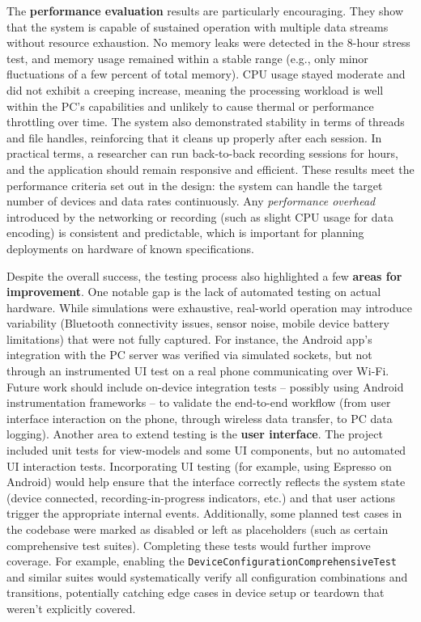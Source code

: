 The \textbf{performance evaluation} results are particularly encouraging. They show that the system is capable of sustained operation with multiple data streams without resource exhaustion. No memory leaks were detected in the 8-hour stress test, and memory usage remained within a stable range (e.g., only minor fluctuations of a few percent of total memory). CPU usage stayed moderate and did not exhibit a creeping increase, meaning the processing workload is well within the PC's capabilities and unlikely to cause thermal or performance throttling over time. The system also demonstrated stability in terms of threads and file handles, reinforcing that it cleans up properly after each session. In practical terms, a researcher can run back-to-back recording sessions for hours, and the application should remain responsive and efficient. These results meet the performance criteria set out in the design: the system can handle the target number of devices and data rates continuously. Any \emph{performance overhead} introduced by the networking or recording (such as slight CPU usage for data encoding) is consistent and predictable, which is important for planning deployments on hardware of known specifications.

Despite the overall success, the testing process also highlighted a few \textbf{areas for improvement}. One notable gap is the lack of automated testing on actual hardware. While simulations were exhaustive, real-world operation may introduce variability (Bluetooth connectivity issues, sensor noise, mobile device battery limitations) that were not fully captured. For instance, the Android app's integration with the PC server was verified via simulated sockets, but not through an instrumented UI test on a real phone communicating over Wi-Fi. Future work should include on-device integration tests -- possibly using Android instrumentation frameworks -- to validate the end-to-end workflow (from user interface interaction on the phone, through wireless data transfer, to PC data logging). Another area to extend testing is the \textbf{user interface}. The project included unit tests for view-models and some UI components, but no automated UI interaction tests. Incorporating UI testing (for example, using Espresso on Android) would help ensure that the interface correctly reflects the system state (device connected, recording-in-progress indicators, etc.) and that user actions trigger the appropriate internal events. Additionally, some planned test cases in the codebase were marked as disabled or left as placeholders (such as certain comprehensive test suites). Completing these tests would further improve coverage. For example, enabling the \texttt{DeviceConfigurationComprehensiveTest} and similar suites would systematically verify all configuration combinations and transitions, potentially catching edge cases in device setup or teardown that weren't explicitly covered.

